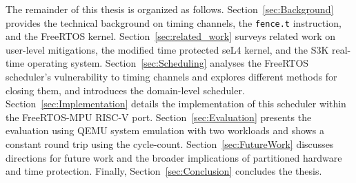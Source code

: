 The remainder of this thesis is organized as follows.
Section~\ref{sec:Background} provides the technical background on timing
channels, the \texttt{fence.t} instruction, and the FreeRTOS kernel.
Section~\ref{sec:related_work} surveys related work on user-level mitigations,
the modified time protected seL4 kernel, and the S3K real-time operating
system. Section~\ref{sec:Scheduling} analyses the FreeRTOS scheduler's
vulnerability to timing channels and explores different methods for closing
them, and introduces the domain-level scheduler.
Section~\ref{sec:Implementation} details the implementation of this scheduler
within the FreeRTOS-MPU RISC-V port. Section~\ref{sec:Evaluation} presents the
evaluation using QEMU system emulation with two workloads and shows a constant
round trip using the cycle-count. Section~\ref{sec:FutureWork} discusses
directions for future work and the broader implications of partitioned hardware
and time protection. Finally, Section~\ref{sec:Conclusion} concludes the
thesis.
